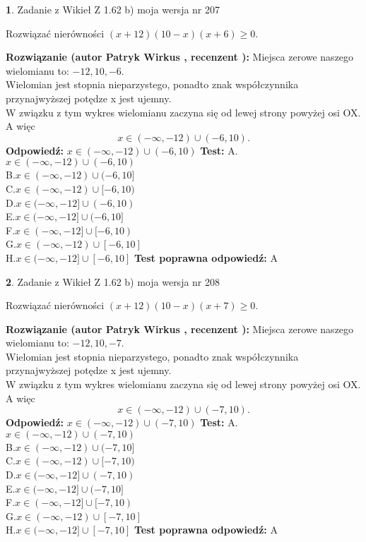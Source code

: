 \documentclass[12pt, a4paper]{article}
\theoremstyle{definition} %
\newtheorem{zad}{}
\newcommand{\zadStart}[1]{\begin{zad}#1\newline}
\newcommand{\zadStop}{\end{zad}}
\newcommand{\rozwStart}[2]{\noindent \textbf{Rozwiązanie (autor #1 , recenzent #2): }\newline}
\newcommand{\rozwStop}{\newline}
\newcommand{\odpStart}{\noindent \textbf{Odpowiedź:}\newline}
\newcommand{\odpStop}{\newline}
\newcommand{\testStart}{\noindent \textbf{Test:}\newline}
\newcommand{\testStop}{\newline}
\newcommand{\kluczStart}{\noindent \textbf{Test poprawna odpowiedź:}\newline}
\newcommand{\kluczStop}{\newline}
\begin{document}
\zadStart{Zadanie z Wikieł Z 1.62 b) moja wersja nr 207}

Rozwiązać nierówności $(x+12)(10-x)(x+6)\ge0$.
\zadStop
\rozwStart{Patryk Wirkus}{}
Miejsca zerowe naszego wielomianu to: $-12, 10, -6$.\\
Wielomian jest stopnia nieparzystego, ponadto znak współczynnika przy\linebreak najwyższej potędze x jest ujemny.\\ W związku z tym wykres wielomianu zaczyna się od lewej strony powyżej osi OX. A więc $$x \in (-\infty,-12) \cup (-6,10).$$
\rozwStop
\odpStart
$x \in (-\infty,-12) \cup (-6,10)$
\odpStop
\testStart
A.$x \in (-\infty,-12) \cup (-6,10)$\\
B.$x \in (-\infty,-12) \cup (-6,10]$\\
C.$x \in (-\infty,-12) \cup [-6,10)$\\
D.$x \in (-\infty,-12] \cup (-6,10)$\\
E.$x \in (-\infty,-12] \cup (-6,10]$\\
F.$x \in (-\infty,-12] \cup [-6,10)$\\
G.$x \in (-\infty,-12) \cup [-6,10]$\\
H.$x \in (-\infty,-12] \cup [-6,10]$
\testStop
\kluczStart
A
\kluczStop



\zadStart{Zadanie z Wikieł Z 1.62 b) moja wersja nr 208}

Rozwiązać nierówności $(x+12)(10-x)(x+7)\ge0$.
\zadStop
\rozwStart{Patryk Wirkus}{}
Miejsca zerowe naszego wielomianu to: $-12, 10, -7$.\\
Wielomian jest stopnia nieparzystego, ponadto znak współczynnika przy\linebreak najwyższej potędze x jest ujemny.\\ W związku z tym wykres wielomianu zaczyna się od lewej strony powyżej osi OX. A więc $$x \in (-\infty,-12) \cup (-7,10).$$
\rozwStop
\odpStart
$x \in (-\infty,-12) \cup (-7,10)$
\odpStop
\testStart
A.$x \in (-\infty,-12) \cup (-7,10)$\\
B.$x \in (-\infty,-12) \cup (-7,10]$\\
C.$x \in (-\infty,-12) \cup [-7,10)$\\
D.$x \in (-\infty,-12] \cup (-7,10)$\\
E.$x \in (-\infty,-12] \cup (-7,10]$\\
F.$x \in (-\infty,-12] \cup [-7,10)$\\
G.$x \in (-\infty,-12) \cup [-7,10]$\\
H.$x \in (-\infty,-12] \cup [-7,10]$
\testStop
\kluczStart
A
\kluczStop
\end{document}
